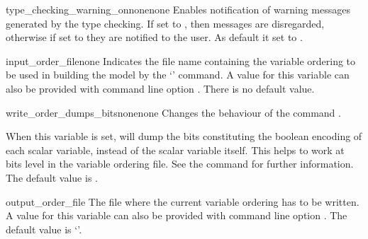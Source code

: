 \begin{nusmvVar}{type\_checking\_warning\_on}{none}{none}
  Enables notification of warning messages generated by the type
  checking. If set to , then messages are disregarded,
  otherwise if set to  they are notified to the user.
%
  As default it set to .
\end{nusmvVar}







\begin{nusmvVar} {input\_order\_file}{}{none}
\label{input_order_file}
Indicates the file name containing the variable ordering to be used in
building the model by the `' command.
%
A value for this variable can also be provided with command line
option .
%
There is no default value.
\end{nusmvVar}

\begin{nusmvVar} {write\_order\_dumps\_bits}{none}{none}
Changes the behaviour of the command .

When this variable is set,  will dump the bits
constituting the boolean encoding of each scalar variable, instead of
the scalar variable itself. This helps to work at bits level in the
variable ordering file. See the command  for
further information. The default value is .
\end{nusmvVar}



\begin{nusmvVar} {output\_order\_file}{}
{}
%
The file where the current variable ordering has to be written. A
value for this variable can also be provided with command line option
.
%
The default value is `'.
%
\end{nusmvVar}

